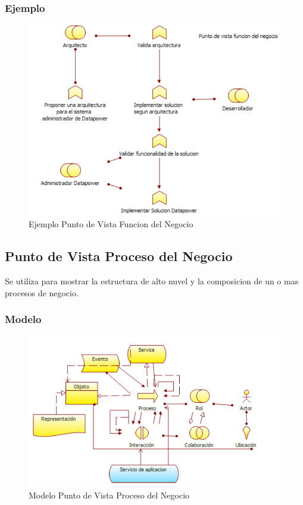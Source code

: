 \subsubsection{Ejemplo}
    \begin{figure}[th!]
        \centering
        \includegraphics[width=1.0\textwidth]{Arquitectura/images/Punto_de_Vista_de_Funcion_del_Negocio.pdf}
        \caption{Ejemplo Punto de Vista Funcion del Negocio}
    \end{figure}
\newpage

\subsection{Punto de Vista Proceso del Negocio}
Se utiliza para mostrar la estructura de alto nuvel y la composicion de un o mas procesos de negocio.
\subsubsection{Modelo}
    \begin{figure}[th!]
        \centering
        \includegraphics[width=1.0\textwidth]{Arquitectura/images/modelo/Punto_de_Vista_de_Proceso_de_Negocio.pdf}
        \caption{Modelo Punto de Vista Proceso del Negocio}
    \end{figure}
\newpage
